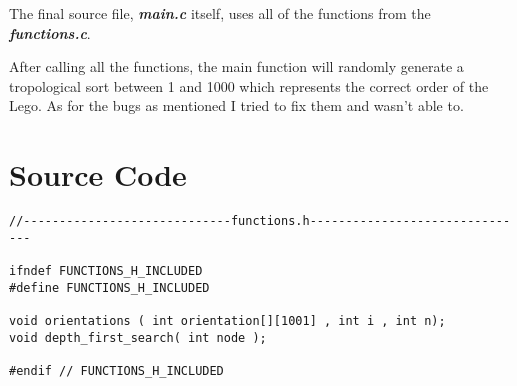 \documentclass[14pt]{article}
\begin{document}
\vspace{3 mm}
The final source file, \textbf{\textit{main.c}} itself, uses all of the functions from the \textbf{\textit{functions.c}}.

After calling all the functions, the main function will randomly generate a tropological sort between 1 and 1000 which represents the correct order of the Lego. As for the bugs as mentioned I tried to fix them and wasn't able to.
\newpage
\section*{Source Code}
\begin{lstlisting}
//-----------------------------functions.h-------------------------------

ifndef FUNCTIONS_H_INCLUDED
#define FUNCTIONS_H_INCLUDED

void orientations ( int orientation[][1001] , int i , int n);
void depth_first_search( int node );

#endif // FUNCTIONS_H_INCLUDED

\end{lstlisting}
\end{document}
